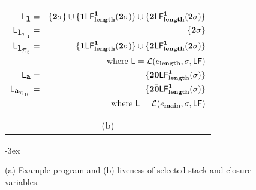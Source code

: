 \begin{figure}[t!]
\begin{tabular}{@{}c@{}}
\begin{minipage}{.51\textwidth}
      \small
\begin{eqnarray*}
 \Lv_{\xl} &=& \{\clazy\sigma\} \cup \{\acdr\Lf{\length}{\acdr}{\clazy\sigma}\} \cup \{\clazy\Lf{\length}{\acdr}{\clazy\sigma}\}\\
 \Lv_{\xl_{\mbox{$\pi$}_1}} &=& \{\clazy\sigma\} \\
 \Lv_{\xl_{\mbox{$\pi$}_5}} &=&  \{\acdr\Lf{\length}{\acdr}{\clazy\sigma}\} \cup \{\clazy\Lf{\length}{\acdr}{\clazy\sigma}\} \\
  &&     \mbox{where } \Lv = \mathcal{L}(e_{\length},\sigma,\Lfonly) \\
 \Lv_{\pa} &=& \{\clazy\bcar\Lf{\length}{\acdr}{\sigma}\}\\
\Lv_{{\pa}_{\mbox{$\pi$}_{10}}} &=&  \{\clazy\bcar\Lf{\length}{\acdr}{\sigma}\}\\
 &&       \mbox{where }  \Lv =  \mathcal{L}(e_{\main},\sigma,\Lfonly) 
\end{eqnarray*}
    \end{minipage} \\
(b)
  \end{tabular}
\kern -3ex
\caption{(a) Example program and (b) liveness of selected 
stack and closure variables.}\label{fig:mot-example2}
\end{figure}


